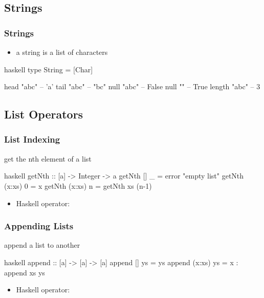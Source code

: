 \documentclass[dvipsnames]{beamer}
\theoremstyle{plain}
\begin{document}
\subsection{Strings}

\begin{frame}[fragile]
  \frametitle{Strings}

  \begin{itemize}
    \item a string is a list of characters
  \end{itemize}

  \begin{exampleblock}{}
    \begin{pygments}{haskell}
type String = [Char]

head "abc"    -- 'a'
tail "abc"    -- "bc"
null "abc"    -- False
null ""       -- True
length "abc"  -- 3
    \end{pygments}
  \end{exampleblock}
\end{frame}

\subsection{List Operators}

\begin{frame}[fragile]
  \frametitle{List Indexing}

  \begin{exampleblock}{get the nth element of a list}
    \begin{pygments}{haskell}
getNth :: [a] -> Integer -> a
getNth []     _ = error "empty list"
getNth (x:xs) 0 = x
getNth (x:xs) n = getNth xs (n-1)
    \end{pygments}
  \end{exampleblock}

  \begin{itemize}
    \item Haskell operator: 
  \end{itemize}
\end{frame}

\begin{frame}[fragile]
  \frametitle{Appending Lists}

  \begin{exampleblock}{append a list to another}
    \begin{pygments}{haskell}
append :: [a] -> [a] -> [a]
append []     ys = ys
append (x:xs) ys = x : append xs ys
    \end{pygments}
  \end{exampleblock}

  \begin{itemize}
    \item Haskell operator: 
  \end{itemize}
\end{frame}
\end{document}
